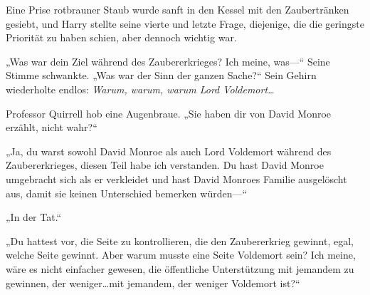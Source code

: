 Eine Prise rotbrauner Staub wurde sanft in den Kessel mit den Zaubertränken gesiebt, und Harry stellte seine vierte und letzte Frage, diejenige, die die geringste Priorität zu haben schien, aber dennoch wichtig war.

„Was war dein Ziel während des Zaubererkrieges? Ich meine, was—“
Seine Stimme schwankte.
„Was war der Sinn der ganzen Sache?“
Sein Gehirn wiederholte endlos: \emph{Warum, warum, warum Lord Voldemort…}

Professor Quirrell hob eine Augenbraue.
„Sie haben dir von David Monroe erzählt, nicht wahr?“

„Ja, du warst sowohl David Monroe als auch Lord Voldemort während des Zaubererkrieges, diesen Teil habe ich verstanden. Du hast David Monroe umgebracht sich als er verkleidet und hast David Monroes Familie ausgelöscht aus, damit sie keinen Unterschied bemerken würden—“

„In der Tat.“

„Du hattest vor, die Seite zu kontrollieren, die den Zaubererkrieg gewinnt, egal, welche Seite gewinnt. Aber warum musste eine Seite Voldemort sein? Ich meine, wäre es nicht einfacher gewesen, die öffentliche Unterstützung mit jemandem zu gewinnen, der weniger…mit jemandem, der weniger Voldemort ist?“

